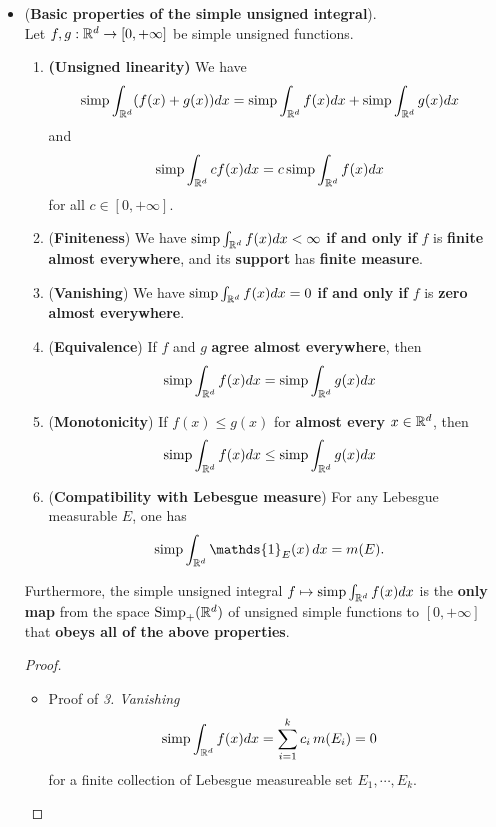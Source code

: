 \documentclass[11pt]{article}
\begin{document}
\begin{itemize}
\item \begin{proposition}(\textbf{Basic properties of the simple unsigned integral}). \\
Let $f, g: {\mathbb R}^d \rightarrow [0, +\infty]$ be simple unsigned functions.
\begin{enumerate}
\item \textbf{(Unsigned linearity)} We have
\begin{align*}
\text{simp} \int_{{\mathbb R}^d} (f(x) + g(x)) dx &= \text{simp} \int_{{\mathbb R}^d} f(x) dx +  \text{simp} \int_{{\mathbb R}^d} g(x) dx
\end{align*}
and
\begin{align*}
\text{simp} \int_{{\mathbb R}^d} cf(x)  dx &=c\, \text{simp} \int_{{\mathbb R}^d} f(x) dx
\end{align*} for all $c \in [0, +\infty]$.
\item (\textbf{Finiteness}) We have $\text{simp} \int_{{\mathbb R}^d} f(x) dx < \infty$ \textbf{if and only if} $f$ is \textbf{finite} \textbf{almost everywhere}, and its \textbf{support} has \textbf{finite
measure}.
\item (\textbf{Vanishing}) We have $\text{simp} \int_{{\mathbb R}^d} f(x) dx = 0$ \textbf{if and only if} $f$ is \textbf{zero almost everywhere}.
\item (\textbf{Equivalence}) If $f$ and $g$ \textbf{agree almost everywhere}, then
\begin{align*}
\text{simp} \int_{{\mathbb R}^d} f(x) dx &= \text{simp} \int_{{\mathbb R}^d} g(x) dx
\end{align*}
\item (\textbf{Monotonicity}) If $f(x) \le g(x)$ for \textbf{almost every} $x \in {\mathbb R}^d$, then
\begin{align*}
\text{simp} \int_{{\mathbb R}^d} f(x) dx &\le \text{simp} \int_{{\mathbb R}^d} g(x) dx
\end{align*}
\item (\textbf{Compatibility with Lebesgue measure}) For any Lebesgue measurable $E$, one has 
\begin{align*}
\text{simp} \int_{\bR^d} \mathds{1}_{E}(x)\,dx &= m(E). 
\end{align*}
\end{enumerate}
Furthermore, the simple unsigned integral $f \mapsto \text{simp} \int_{{\mathbb R}^d} f(x) dx$ is the \textbf{only map} from the space $\text{Simp}_{+}({\mathbb R}^d)$ of unsigned simple functions to $[0, +\infty]$ that \textbf{obeys all of the above properties}.
\end{proposition}
\begin{proof}
\begin{itemize}
\item Proof of \emph{3. Vanishing}
\begin{align*}
\text{simp}\int_{{\mathbb R}^{d}}f(x) dx &= \sum_{i=1}^{k}c_{i}\,m(E_{i}) = 0
\end{align*}
for a finite collection of Lebesgue measureable set $E_{1},\cdots, E_{k}$.


\end{itemize}
\end{proof}
\end{itemize}
\end{document}
